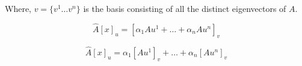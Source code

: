 \documentclass[a4paper]{article}
\begin{document}
\begin{qalist}
			Where, $v = \{{v}^{1} \ldots {v}^{n}\}$  is the basis consisting of all the distinct eigenvectors of $A$.
			
			\begin{equation}
				\hat{A}{[x]}_{u} = {[{\alpha}_{1}A{u}^{1} + \ldots + {\alpha}_{n}A{u}^{n}]}_{v}
			\end{equation}	
			
			\begin{equation}
				\hat{A}{[x]}_{u} = {\alpha}_{1}{[A{u}^{1}]}_{v} + \ldots + {\alpha}_{n}{[A{u}^{n}]}_{v}
			\end{equation}	
		
	\end{qalist}
\end{document}
